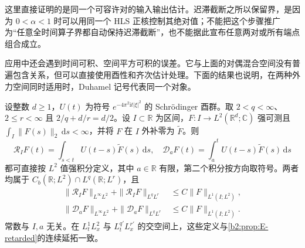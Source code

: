 \ProseParagraphBreak

这里直接证明的是同一个可容许对的输入输出估计。迟滞截断之所以保留界，是因为 \(0<\alpha<1\) 时可以用同一个 HLS 正核控制其绝对值；不能把这个步骤推广为“任意全时间算子界都自动保持迟滞截断”，也不能据此宣布任意两对或所有端点组合成立。

\ProseParagraphBreak

应用中还会遇到时间可积、空间平方可积的误差。它与上面的对偶混合空间没有普遍包含关系，但可以直接使用酉性和齐次估计处理。下面的结果也说明，在两种外力空间同时适用时，Duhamel 记号代表同一个对象。

\begin{proposition}[时间可积的平方可积外力]\label{b2:prop:E-l1l2-forcing}
设整数 \(d\geq1\)，\(U(t)\) 为符号 \(e^{-4\pi^2\mathrm it|\xi|^2}\) 的 Schrödinger 酉群。取 \(2<q<\infty\)、\(2\leq r<\infty\) 且 \(2/q+d/r=d/2\)。设 \(I\subset\mathbb R\) 为区间，\(F:I\to L^2(\mathbb R^d;\mathbb C)\) 强可测且
\(\int_I\|F(s)\|_2\,\mathrm ds<\infty\)，并将 \(F\) 在 \(I\) 外补零为 \(\widetilde F\)。则
\[
 \mathcal R_I F(t)=\int_{s<t}U(t-s)\widetilde F(s)\,\mathrm ds,
 \quad
 \mathcal D_aF(t)=\int_a^tU(t-s)\widetilde F(s)\,\mathrm ds
\]
都可直接按 \(L^2\) 值强积分定义，其中 \(a\in\mathbb R\) 有限，第二个积分按方向取符号。两者均属于 \(C_b(\mathbb R;L^2)\cap L^q(\mathbb R;L^r)\)，且
\begin{equation}\label{b2:eq:E-l1l2-forcing}
 \begin{aligned}
 \|\mathcal R_I F\|_{L^\infty L^2}
 +\|\mathcal R_I F\|_{L^qL^r}
 &\leq C\|F\|_{L^1(I;L^2)},\\
 \|\mathcal D_aF\|_{L^\infty L^2}
 +\|\mathcal D_aF\|_{L^qL^r}
 &\leq C\|F\|_{L^1(I;L^2)}.
 \end{aligned}
\end{equation}
常数与 \(I,a\) 无关。在 \(L^1_tL^2_x\) 与 \(L^{q'}_tL^{r'}_x\) 的交空间上，这些定义与\cref{b2:prop:E-retarded}的连续延拓一致。
\end{proposition}
